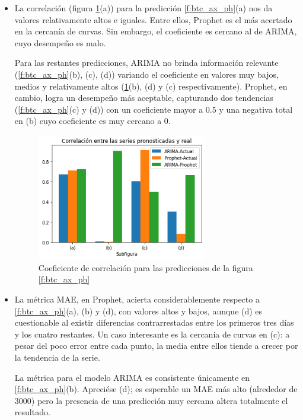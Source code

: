 \documentclass[a4paper,10pt]{article}
\begin{document}
\begin{itemize}

 \item La correlación (figura \ref{f:corr}(a)) para la predicción \ref{f:btc_ax_ph}(a) nos da valores relativamente altos e iguales. Entre ellos, Prophet es el más acertado en la cercanía de curvas. Sin embargo, el coeficiente es cercano al de ARIMA, cuyo desempeño es malo.

 Para las restantes predicciones, ARIMA no brinda información relevante (\ref{f:btc_ax_ph}(b), (c), (d)) variando el coeficiente en valores muy bajos, medios y relativamente altos (\ref{f:corr}(b), (d) y (c) respectivamente). Prophet, en cambio, logra un desempeño más aceptable, capturando dos tendencias (\ref{f:btc_ax_ph}(c) y (d)) con un coeficiente mayor a 0.5 y una negativa total en (b) cuyo coeficiente es muy cercano a 0.

 \begin{figure}[h!]
 \centering
  \includegraphics[width=0.7\textwidth]{./plots/btc_ax_ph/corr}
  \caption{Coeficiente de correlación para las predicciones de la figura \ref{f:btc_ax_ph}}
  \label{f:corr}
\end{figure}

 \item La métrica MAE, en Prophet, acierta considerablemente respecto a \ref{f:btc_ax_ph}(a), (b) y (d), con valores altos y bajos, aunque (d) es cuestionable al existir diferencias contrarrestadas entre los primeros tres días y los cuatro restantes. Un caso interesante es la cercanía de curvas en (c): a pesar del poco error entre cada punto, la media entre ellos tiende a crecer por la tendencia de la serie.

 La métrica para el modelo ARIMA es consistente únicamente en \ref{f:btc_ax_ph}(b). Apreciése (d); es esperable un MAE más alto (alrededor de 3000) pero la presencia de una predicción muy cercana altera totalmente el resultado.


\end{itemize}
\end{document}
